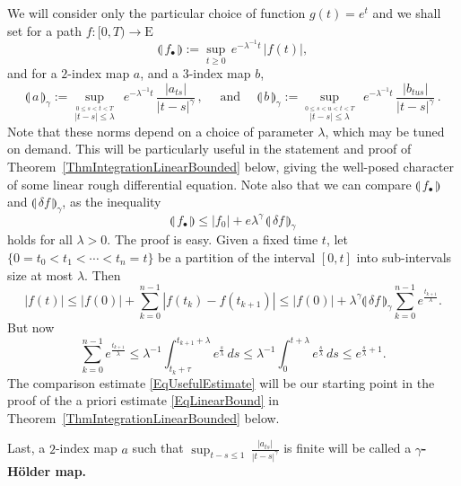 \documentclass[11pt,a4paper]{amsart}
\renewcommand{\leq}{\leqslant}
\renewcommand{\geq}{\geqslant}
\theoremstyle{plain}%
\theoremstyle{definition}
\theoremstyle{remark}
\numberwithin{equation}{section} %
\begin{document}
We will consider only the particular choice of function $g(t) = e^{t}$ and we shall set for a path $f : [0,T)\rightarrow \textrm{E}$
\begin{equation}
\label{EqDefnNormFunction}
\llparenthesis\, f_\bullet \,\rrparenthesis :=  \underset{t\geq 0}{\sup}\,e^{-\lambda^{-1} t}\,| f(t) |,
\end{equation}
and for a $2$-index map $a$, and a  $3$-index map $b$,
\begin{equation}
\label{EqDefnNormMultiIndexMaps}
\llparenthesis\, a \,\rrparenthesis_\gamma := \underset{\stackrel{0\leq s<t<T}{|t-s|\le \lambda}}{\sup} \;\, e^{-\lambda^{-1} t} \,\frac{| a_{ts}|}{|t-s|^\gamma}\,, \quad \textrm{ and }\quad 
\llparenthesis\, b \,\rrparenthesis_\gamma := \underset{\stackrel{0\leq s< u<t<T}{{|t-s|\le \lambda}}}{\sup} \;\, e^{-\lambda^{-1} t} \,\frac{| b_{tus}|}{|t-s|^\gamma}\,.
\end{equation}
Note that these norms depend on a choice of parameter $\lambda$, which may be tuned on demand. This will be particularly useful in the statement and proof of Theorem~\ref{ThmIntegrationLinearBounded} below, giving the well-posed character of some linear rough differential equation. Note also that we can compare $\llparenthesis\, f_\bullet \,\rrparenthesis$ and $\llparenthesis\, \delta f \,\rrparenthesis_\gamma$, as the inequality
\begin{equation}
\label{EqUsefulEstimate}
\llparenthesis\, f_\bullet \,\rrparenthesis \leq |f_0| + e \lambda^\gamma\,\llparenthesis\, \delta f \,\rrparenthesis_\gamma
\end{equation}
holds for all $\lambda>0$. The proof is easy. Given a fixed time $t$, let $\{0=t_0< t_1 < \cdots < t_n = t\}$ be a partition of the interval $[0,t]$ into sub-intervals size at most $\lambda$. Then 
$$
|f(t)| \le |f(0)| + \sum_{k=0}^{n-1} | f(t_k) - f(t_{k+1}) | \le  |f(0)| +  \lambda^\gamma  \llparenthesis\, \delta f \,\rrparenthesis_\gamma \sum_{k=0}^{n-1} e^{\frac{t_{k+1}}{\lambda}}.
$$
But now
$$
\sum_{k=0}^{n-1} e^{\frac{t_{k+1}}{\lambda}}
\le   \lambda^{-1}\int_{t_{k}+\tau}^{t_{k+1}+\lambda} e^\frac{s}{\lambda}\, ds \le  \lambda^{-1} \int_0^{t+\lambda} e^\frac{s}{\lambda}\, ds \le e^{\frac{s}{\lambda}+1}.
$$
The comparison estimate \eqref{EqUsefulEstimate} will be our starting point in the proof of the a priori estimate \eqref{EqLinearBound} in Theorem~\ref{ThmIntegrationLinearBounded} below. 

\smallskip

Last, a $2$-index map $a$ such that $\sup_{t-s\leq 1}\,\frac{| a_{ts} |}{|t-s|^\gamma}$ is finite will be called a $\gamma$\textbf{-H\"older map.}
\end{document}
